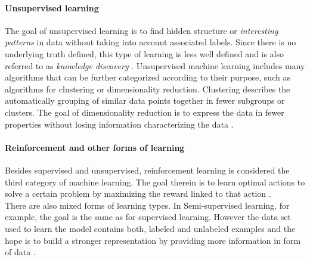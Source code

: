 \paragraph{Unsupervised learning}
The goal of unsupervised learning is to find hidden structure or \textit{interesting patterns} in data without taking into account associated labels. Since there is no underlying truth defined, this type of learning is less well defined and is also referred to as \textit{knowledge discovery} \cite{Murphy2012}. Unsupervised machine learning includes many algorithms that can be further categorized according to their purpose, such as algorithms for clustering or dimensionality reduction. Clustering describes the automatically grouping of similar data points together in fewer subgroups or clusters. The goal of dimensionality reduction is to express the data in fewer properties without losing information characterizing the data \cite{Cunningham2014}. 

\paragraph{Reinforcement and other forms of learning}
Besides supervised and unsupervised, reinforcement learning is considered the third category of machine learning. The goal therein is to learn optimal actions to solve a certain problem by maximizing the reward linked to that action \cite{Murphy2012}.\\
There are also mixed forms of learning types. In Semi-supervised learning, for example, the goal is the same as for supervised learning. However the data set used to learn the model contains both, labeled and unlabeled examples and the hope is to build a stronger representation by providing more information in form of data \cite{Burkov2019}.\\
\\

